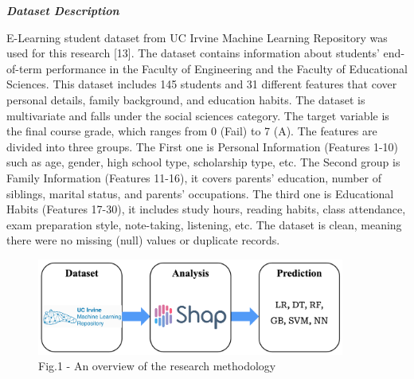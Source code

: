 \begin{multicols}{2}
\emph{{\bfseries Dataset Description}}

E-Learning student dataset from UC Irvine Machine Learning Repository
was used for this research {[}13{]}. The dataset contains information
about students'{} end-of-term performance in the Faculty
of Engineering and the Faculty of Educational Sciences. This dataset
includes 145 students and 31 different features that cover personal
details, family background, and education habits. The dataset is
multivariate and falls under the social sciences category. The target
variable is the final course grade, which ranges from 0 (Fail) to 7 (A).
The features are divided into three groups. The First one is Personal
Information (Features 1-10) such as age, gender, high school type,
scholarship type, etc. The Second group is Family Information (Features
11-16), it covers parents'{} education, number of
siblings, marital status, and parents'{} occupations. The
third one is Educational Habits (Features 17-30), it includes study
hours, reading habits, class attendance, exam preparation style,
note-taking, listening, etc. The dataset is clean, meaning there were no
missing (null) values or duplicate records.
\end{multicols}

\begin{figure}[H]
	\centering
	\includegraphics[width=0.9\textwidth]{media/ict/image17}
	\caption*{Fig.1 - An overview of the research methodology}
\end{figure}

